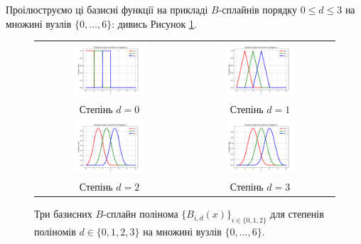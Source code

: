 Проілюструємо ці базисні функції на прикладі $B$-сплайнів порядку $0 \leq d \leq
3$ на множині вузлів $\{0,\dots,6\}$: дивись Рисунок \ref{fig:b-splines}.
\begin{figure}
    \begin{tabular}{cc}
      \includegraphics[width=0.5\textwidth]{code/splines/bspline_degree_0.pdf} &   \includegraphics[width=0.5\textwidth]{code/splines/bspline_degree_1.pdf} \\
      Степінь $d=0$ & Степінь $d=1$ \\
      \includegraphics[width=0.5\textwidth]{code/splines/bspline_degree_2.pdf} &   \includegraphics[width=0.5\textwidth]{code/splines/bspline_degree_3.pdf} \\
      Степінь $d=2$ & Степінь $d=3$
    \end{tabular}
    \caption{Три базисних $B$-сплайн полінома $\{B_{i,d}(x)\}_{i \in \{0,1,2\}}$
    для степенів поліномів $d \in \{0,1,2,3\}$ на множині вузлів $\{0,\dots,6\}$.}
    \label{fig:b-splines}
\end{figure}

